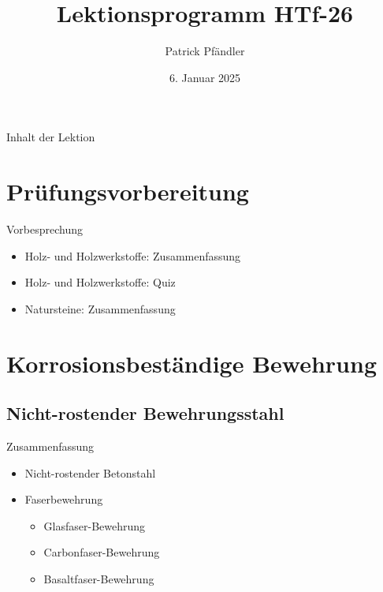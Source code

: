 \def\customoptions{aspectratio=169} %

\title{\textbf{Lektionsprogramm HTf-26}}
\author{Patrick Pfändler}
\date{6. Januar 2025}




\frame{\titlepage}

\begin{frame}{Inhalt der Lektion}
    \tableofcontents
\end{frame}


\section{Prüfungsvorbereitung}
\BlueSectionSlide
\begin{frame}{Vorbesprechung}
    \begin{itemize}
        \item[\textbullet]  Holz- und Holzwerkstoffe: Zusammenfassung
        \item[\textbullet]  Holz- und Holzwerkstoffe: Quiz
        \item[\textbullet]  Natursteine: Zusammenfassung
    \end{itemize}
\end{frame}


\section{Korrosionsbeständige Bewehrung}

\BlueSectionSlide
\subsection{Nicht-rostender Bewehrungsstahl}
\begin{frame}{Zusammenfassung}

    \begin{itemize}
        \item[\textbullet]  Nicht-rostender Betonstahl
        \item[\textbullet]  Faserbewehrung
              \begin{itemize}
                  \item[\textbullet]  Glasfaser-Bewehrung
                  \item[\textbullet]  Carbonfaser-Bewehrung
                  \item[\textbullet]  Basaltfaser-Bewehrung
              \end{itemize}
    \end{itemize}

\end{frame}

